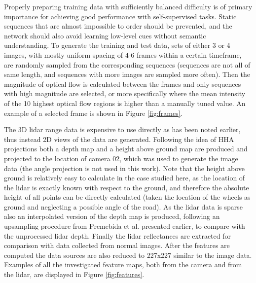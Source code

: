 Properly preparing training data with sufficiently balanced difficulty is of primary importance for achieving good performance with self-supervised tasks. Static sequences that are almost impossible to order should be prevented, and the network should also avoid learning low-level cues without semantic understanding. To generate the training and test data, sets of either 3 or 4 images, with mostly uniform spacing of 4-6 frames within a certain timeframe, are randomly sampled from the corresponding sequences (sequences are not all of same length, and sequences with more images are sampled more often). Then the magnitude of optical flow is calculated between the frames and only sequences with high magnitude are selected\cite{misra2016}, or more specifically where the mean intensity of the 10 highest optical flow regions is higher than a manually tuned value. An example of a selected frame is shown in Figure \ref{fig:frames}.


The 3D lidar range data is expensive to use directly as has been noted earlier, thus instead 2D views of the data are generated. Following the idea of HHA projections both a depth map and a height above ground map are produced and projected to the location of camera 02, which was used to generate the image data (the angle projection is not used in this work). Note that the height above ground is relatively easy to calculate in the case studied here, as the location of the lidar is exactly known with respect to the ground, and therefore the absolute height of all points can be directly calculated (taken the location of the wheels as ground and neglecting a possible angle of the road). As the lidar data is sparse also an interpolated version of the depth map is produced, following an upsampling procedure from Premebida et al.\cite{premebida2014} presented earlier, to compare with the unprocessed lidar depth. Finally the lidar reflectances are extracted for comparison with data collected from normal images. After the features are computed the data sources are also reduced to 227x227 similar to the image data. Examples of all the investigated feature maps, both from the camera and from the lidar, are displayed in Figure \ref{fig:features}.

